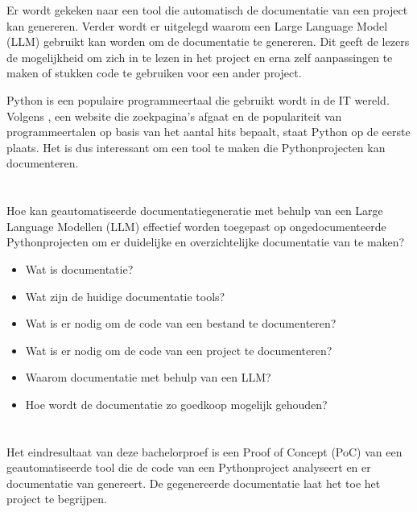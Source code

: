 Er wordt gekeken naar een tool die automatisch de documentatie van een project kan genereren.
Verder wordt er uitgelegd waarom een Large Language Model (LLM) gebruikt kan worden om de documentatie te genereren.
Dit geeft de lezers de mogelijkheid om zich in te lezen in het project en erna zelf aanpassingen te maken of stukken code te gebruiken voor een ander project.

Python is een populaire programmeertaal die gebruikt wordt in de IT wereld.
Volgens \textcite{TIOBE2024}, een website die zoekpagina's afgaat en de populariteit van programmeertalen op basis van het aantal hits bepaalt, staat Python op de eerste plaats.
Het is dus interessant om een tool te maken die Pythonprojecten kan documenteren.

\section{}%
\label{sec:onderzoeksvraag}

Hoe kan geautomatiseerde documentatiegeneratie met behulp van een Large Language Modellen (LLM) effectief worden toegepast op ongedocumenteerde Pythonprojecten om er duidelijke en overzichtelijke documentatie van te maken? 

\begin{itemize}
  \item Wat is documentatie?
  \item Wat zijn de huidige documentatie tools?
  \item Wat is er nodig om de code van een bestand te documenteren?
  \item Wat is er nodig om de code van een project te documenteren?
  \item Waarom documentatie met behulp van een LLM?
  \item Hoe wordt de documentatie zo goedkoop mogelijk gehouden?
\end{itemize}

\section{}%
\label{sec:onderzoeksdoelstelling}

Het eindresultaat van deze bachelorproef is een Proof of Concept (PoC) van een geautomatiseerde tool die de code van een Pythonproject analyseert en er documentatie van genereert.
De gegenereerde documentatie laat het toe het project te begrijpen.

